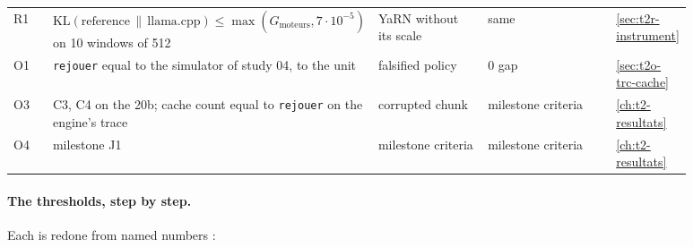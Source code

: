\begin{longtable}{@{}p{0.07\linewidth}p{0.26\linewidth}p{0.21\linewidth}p{0.26\linewidth}p{0.08\linewidth}@{}}
R1 & $\mathrm{KL}(\text{reference} \,\|\, \text{llama.cpp}) \le \max(G_{\text{moteurs}}, 7 \cdot 10^{-5})$ on 10 windows of 512 & YaRN without its scale & same & \cref{sec:t2r-instrument} \\
O1 & \texttt{rejouer} equal to the simulator of study 04, to the unit & falsified policy & 0 gap & \cref{sec:t2o-trc-cache} \\
O3 & C3, C4 on the 20b; cache count equal to \texttt{rejouer} on the engine's trace & corrupted chunk & milestone criteria & \cref{ch:t2-resultats} \\
O4 & milestone J1 & milestone criteria & milestone criteria & \cref{ch:t2-resultats} \\
\bottomrule
\end{longtable}
\endgroup

\paragraph{The thresholds, step by step.} Each is redone from named numbers \calc:
